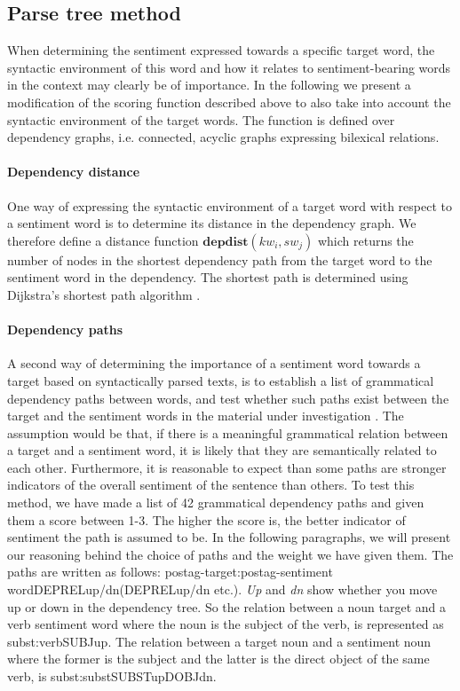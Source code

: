 \documentclass[11pt]{article}
\begin{document}
\subsection{Parse tree method}
\label{sec:dp}
When determining the sentiment expressed towards a specific target
word, the syntactic environment of this word and how it relates to
sentiment-bearing words in the context may clearly be of importance.
In the following we present a modification of the scoring function described above to also take into account the syntactic environment of the target words. The function is defined over dependency graphs, i.e. connected, acyclic graphs expressing bilexical relations.

\paragraph{Dependency distance} One way of expressing the syntactic environment of a target word with respect to a sentiment word is to determine its distance in the dependency graph. We therefore define a distance function $\mathbf{depdist}(kw_i, sw_{j})$ which returns the number of nodes in the shortest dependency path from the target word to the sentiment word in the dependency. The shortest path is determined using Dijkstra's shortest path algorithm \cite{Dij:59}.

\paragraph{Dependency paths}
A second way of determining the importance of a sentiment word towards a target based on syntactically parsed texts, is to establish a list of grammatical dependency paths between words, and test whether such paths exist between the target and the sentiment words in the material under investigation \cite{Jiang11}. The assumption would be that, if there is a meaningful grammatical relation between a target and a sentiment word, it is likely that they are semantically related to each other. Furthermore, it is reasonable to expect than some paths are stronger indicators of the overall sentiment of the sentence than others. To test this method, we have made a list of 42 grammatical dependency paths and given them a score between 1-3. The higher the score is, the better indicator of sentiment the path is assumed to be. In the following paragraphs, we will present our reasoning behind the choice of paths and the weight we have given them. The paths are written as follows: postag-target:postag-sentiment word{\textunderscore}{\textunderscore}DEPREL{\textunderscore}up/dn({\textunderscore}{\textunderscore}DEPREL{\textunderscore}up/dn etc.). \emph{Up} and \emph{dn} show whether you move up or down in the dependency tree. So the relation between a noun target and a verb sentiment word where the noun is the subject of the verb, is represented as subst:verb{\textunderscore}{\textunderscore}SUBJ{\textunderscore}up. The relation between a target noun and a sentiment noun where the former is the subject and the latter is the direct object of the same verb, is subst:subst{\textunderscore}{\textunderscore}SUBST{\textunderscore}up{\textunderscore}{\textunderscore}DOBJ{\textunderscore}dn.
\end{document}

